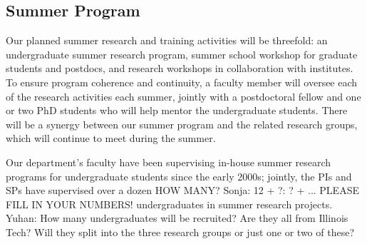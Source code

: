 \documentclass[11pt]{NSFamsart}
\newcommand{\YuhanNote}[1]{{\color{violet} Yuhan: #1}}
\begin{document}
\subsection{Summer Program}    \label{sec:summer}

Our planned summer research and training activities will be threefold: an undergraduate summer research program, summer school workshop for graduate students and postdocs, and research workshops in collaboration with institutes. To ensure program coherence and continuity, a faculty member will oversee each of the research activities each summer, jointly with a postdoctoral fellow and one or two PhD students who will help mentor the undergraduate students.  There will be a synergy between our summer program and the related research groups, which will continue to meet during the summer. 

Our department's faculty have been supervising in-house summer research programs for undergraduate students since the early 2000s; jointly, the PIs and SPs have supervised over a dozen {\color{red}HOW MANY? Sonja: 12 + ?: ? + ... PLEASE FILL IN YOUR NUMBERS!} undergraduates in summer research projects. 
 \YuhanNote{How many undergraduates will be recruited? Are they all from Illinois Tech? Will they split into the three research groups or just one or two of these?}
\end{document}
